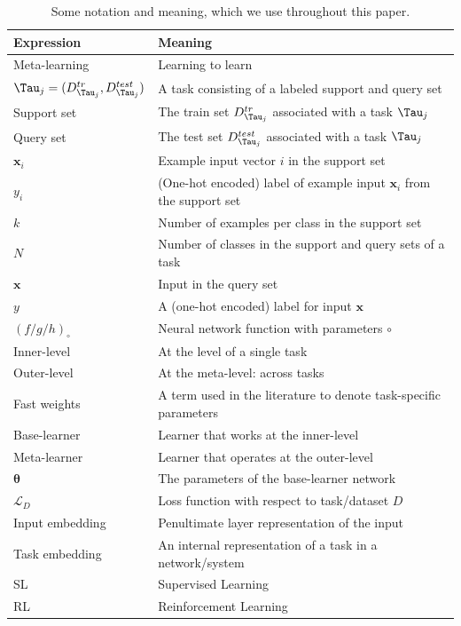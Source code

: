 \begin{table}[tb]
    \begin{tabularx}{\linewidth}{ll}
    \toprule
         Expression & Meaning  \\
         \midrule
         Meta-learning & Learning to learn \\
         $\Tau_{j} = (D^{tr}_{\Tau_{j}}, D^{test}_{\Tau_{j}})$& A task consisting of a labeled support and query set \\ 
         Support set & The train set $D^{tr}_{\Tau_{j}}$ associated with a task $\Tau_{j}$ \\
         Query set & The test set $D^{test}_{\Tau_{j}}$ associated with a task $\Tau_{j}$ \\
         $\boldsymbol{x}_{i}$ & Example input vector $i$ in the support set \\
         $y_{i}$ & (One-hot encoded) label of example input $\boldsymbol{x}_{i}$ from the support set\\
         $k$ & Number of examples per class in the support set \\
         $N$ & Number of classes in the support and query sets of a task \\
         $\boldsymbol{x}$ & Input in the query set \\
         $y$ & A (one-hot encoded) label for input $\boldsymbol{x}$ \\
         $(f/g/h)_{\circ}$ & Neural network function with parameters $\circ$ \\
         Inner-level & At the level of a single task \\
         Outer-level & At the meta-level: across tasks \\
         Fast weights & A term used in the literature to denote task-specific parameters \\
         Base-learner & Learner that works at the inner-level \\
         Meta-learner & Learner that operates at the outer-level \\
         $\boldsymbol{\theta}$ & The parameters of the base-learner network \\
         $\mathcal{L}_D$ & Loss function with respect to task/dataset $D$ \\
         Input embedding & Penultimate layer representation of the input \\
         Task embedding & An internal representation of a task in a network/system \\
         SL & Supervised Learning \\
         RL & Reinforcement Learning \\
         \bottomrule
    \end{tabularx}
    \caption{Some notation and meaning, which we use throughout this paper.}
    \label{tab:notation}
\end{table}

